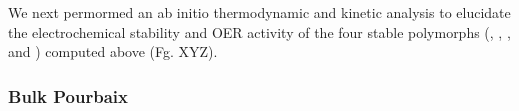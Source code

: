 

We next permormed an ab initio thermodynamic and kinetic analysis to elucidate the electrochemical stability and OER activity of the four stable polymorphs (\rIrOtwo, \aIrOthree, \rIrOthree, and \bIrOthree) computed above (Fg. XYZ).






\subsubsection{Bulk Pourbaix}

